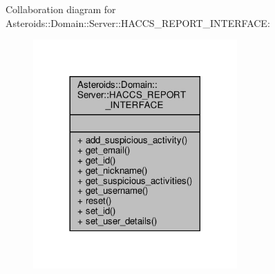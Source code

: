 Collaboration diagram for Asteroids\+:\+:Domain\+:\+:Server\+:\+:H\+A\+C\+C\+S\+\_\+\+R\+E\+P\+O\+R\+T\+\_\+\+I\+N\+T\+E\+R\+F\+A\+CE\+:\nopagebreak
\begin{figure}[H]
\begin{center}
\leavevmode
\includegraphics[width=221pt]{classAsteroids_1_1Domain_1_1Server_1_1HACCS__REPORT__INTERFACE__coll__graph}
\end{center}
\end{figure}
